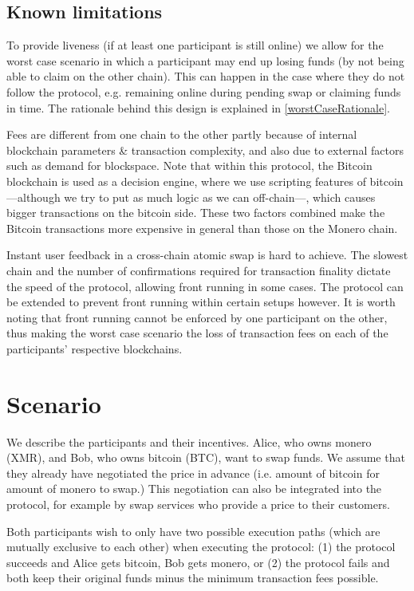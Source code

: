\documentclass{llncs}
\begin{document}
\subsection{Known limitations}
To provide liveness (if at least one participant is still online) we allow for the worst case scenario in which a participant may end up losing funds (by not being able to claim on the other chain). This can happen in the case where they do not follow the protocol, e.g. remaining online during pending swap or claiming funds in time. The rationale behind this design is explained in \ref{worstCaseRationale}.

Fees are different from one chain to the other partly because of internal blockchain parameters \& transaction complexity, and also due to external factors such as demand for blockspace. Note that within this protocol, the Bitcoin blockchain is used as a decision engine, where we use scripting features of bitcoin---although we try to put as much logic as we can off-chain---, which causes bigger transactions on the bitcoin side. These two factors combined make the Bitcoin transactions more expensive in general than those on the Monero chain.

Instant user feedback in a cross-chain atomic swap is hard to achieve.  The slowest chain and the number of confirmations required for transaction finality dictate the speed of the protocol, allowing front running in some cases. The protocol can be extended to prevent front running within certain setups however. It is worth noting that front running cannot be enforced by one participant on the other, thus making the worst case scenario the loss of transaction fees on each of the participants' respective blockchains.

\section{Scenario}
We describe the participants and their incentives. Alice, who owns monero (XMR), and Bob, who owns bitcoin (BTC), want to swap funds. We assume that they already have negotiated the price in advance (i.e. amount of bitcoin for amount of monero to swap.) This negotiation can also be integrated into the protocol, for example by swap services who provide a price to their customers.

Both participants wish to only have two possible execution paths (which are mutually exclusive to each other) when executing the protocol: (1) the protocol succeeds and Alice gets bitcoin, Bob gets monero, or (2) the protocol fails and both keep their original funds minus the minimum transaction fees possible.
\end{document}
